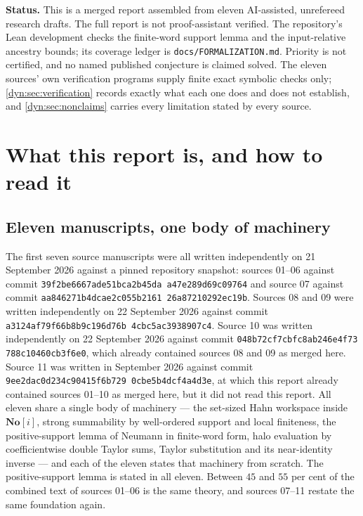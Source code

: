 \documentclass[11pt,letterpaper]{article}
\theoremstyle{definition}
\theoremstyle{remark}
\newcommand{\No}{\mathbf{No}}
\numberwithin{equation}{section}
\begin{document}
\begin{titlepage}
\begin{minipage}{0.92\textwidth}
\begin{abstract}
density.
\end{abstract}
\end{minipage}
\vfill
\begin{minipage}{0.92\textwidth}\small
\textbf{Status.} This is a merged report assembled from eleven AI-assisted,
unrefereed research drafts. The full report is not proof-assistant verified.
The repository's Lean development checks the finite-word support lemma and
the input-relative ancestry bounds; its coverage ledger is
\texttt{docs/FORMALIZATION.md}. Priority is not certified, and no named published
conjecture is claimed solved. The eleven sources' own verification programs
supply finite exact symbolic checks only; \cref{dyn:sec:verification}
records exactly what each one does and does not establish, and
\cref{dyn:sec:nonclaims} carries every limitation stated by every source.
\end{minipage}
\end{titlepage}
\hypersetup{pageanchor=true}
{\small\setlength{\parskip}{0pt}\tableofcontents}
\clearpage
{}

\section{What this report is, and how to read it}
\label{dyn:sec:read}

\subsection{Eleven manuscripts, one body of machinery}
The first seven source manuscripts were all
written independently on 21 September 2026 against a pinned repository
snapshot: sources 01--06 against commit
\texttt{39f2be66\allowbreak 67ade51b\allowbreak ca2b45da\allowbreak
a47e289d\allowbreak 69c09764} and source 07 against commit
\texttt{aa846271\allowbreak b4dcae2c\allowbreak 055b2161\allowbreak
26a87210\allowbreak 292ec19b}. Sources 08 and 09 were written
independently on 22 September 2026 against commit
\texttt{a3124af7\allowbreak 9f66b8b9\allowbreak c196d76b\allowbreak
4cbc5ac3\allowbreak 938907c4}. Source 10 was written independently on
22 September 2026 against commit
\texttt{048b72cf\allowbreak 7cbfc8ab\allowbreak 246e4f73\allowbreak
788c1046\allowbreak 0cb3f6e0}, which already contained sources 08 and 09
as merged here. Source 11 was written in September 2026 against commit
\texttt{9ee2dac0\allowbreak d234c904\allowbreak 15f6b729\allowbreak
0cbe5b4d\allowbreak cf4a4d3e}, at which this report already contained
sources 01--10 as merged here, but it did not read this report. All eleven
share a single body
of machinery --- the set-sized Hahn workspace inside $\No[i]$, strong
summability by well-ordered support and local finiteness, the
positive-support lemma of Neumann in finite-word form, halo evaluation by
coefficientwise double Taylor sums, Taylor substitution and its
near-identity inverse --- and each of the eleven states that machinery
from scratch. The positive-support lemma is stated in all eleven. Between $45$
and $55$ per cent of the combined text of sources 01--06 is the same
theory, and sources 07--11 restate the same foundation again.
\end{document}

